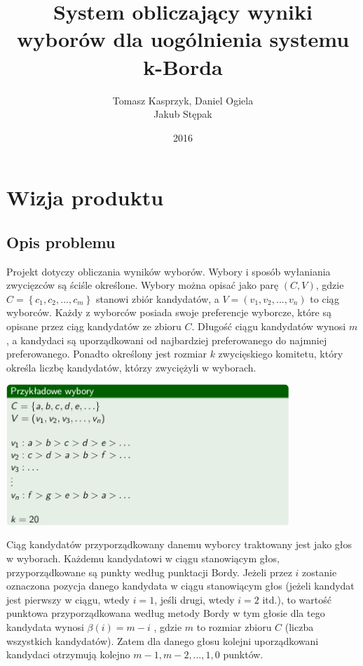 \documentclass[polish,11pt]{aghthesis}
\author{Tomasz Kasprzyk, Daniel Ogiela\\ Jakub Stępak}
\title{System obliczający wyniki wyborów dla uogólnienia systemu k-Borda}
\date{2016}
\begin{document}
\maketitle
\tableofcontents
\clearpage


\section{Wizja produktu}

\subsection{Opis problemu}
\label{opis_problemu}
Projekt dotyczy obliczania wyników wyborów. Wybory i sposób wyłaniania zwycięzców są
ściśle określone. Wybory można opisać jako parę $(C, V)$, gdzie $C = \left\{c_1, c_2, ... , c_m\right\}$ stanowi zbiór kandydatów, a $V = \left(v_1, v_2, ... , v_n\right)$ to ciąg wyborców. Każdy z wyborców posiada swoje preferencje wyborcze, które są opisane przez ciąg kandydatów ze zbioru $C$. Długość ciągu kandydatów wynosi $m$, a kandydaci są uporządkowani od najbardziej preferowanego do najmniej preferowanego. Ponadto określony jest rozmiar $k$ zwycięskiego komitetu, który określa liczbę kandydatów, którzy zwyciężyli w wyborach.

\begin{center}
\includegraphics[width=0.8\textwidth]{pics/przykladowe_wybory.png}
\end{center}
Ciąg kandydatów przyporządkowany danemu wyborcy traktowany jest jako głos w
wyborach. Każdemu kandydatowi w ciągu stanowiącym głos, przyporządkowane są punkty
według punktacji Bordy. Jeżeli przez $i$ zostanie oznaczona pozycja danego kandydata w
ciągu stanowiącym głos (jeżeli kandydat jest pierwszy w ciągu, wtedy $i = 1$, jeśli drugi, wtedy $i = 2$ itd.), to wartość punktowa przyporządkowana według metody Bordy w tym głosie dla tego kandydata wynosi $\beta(i) = m - i$ , gdzie $m$ to rozmiar zbioru $C$ (liczba wszystkich kandydatów). Zatem dla danego głosu kolejni uporządkowani kandydaci otrzymują kolejno $m - 1, m - 2, … , 1, 0$ punktów.
\end{document}
